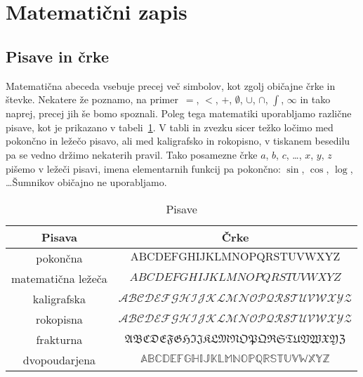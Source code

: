 







\section{Matematični zapis}
\label{sec:matematicni-zapis}

\subsection{Pisave in črke}
\label{sec:pisave-in-crke}


Matematična abeceda vsebuje precej več simbolov, kot zgolj običajne črke in števke. Nekatere že poznamo, na primer~$=$, $<$, $+$, $\emptyset$, $\cup$, $\cap$, $\int$, $\infty$ in tako naprej, precej jih še bomo spoznali. Poleg tega matematiki uporabljamo različne pisave, kot je prikazano v tabeli~\ref{tabela:oblike-crk}. V tabli in zvezku sicer težko ločimo med pokončno in ležečo pisavo, ali med kaligrafsko in rokopisno, v tiskanem besedilu pa se vedno držimo nekaterih pravil. Tako posamezne črke $a$, $b$, $c$, \dots, $x$, $y$, $z$ pišemo v ležeči pisavi, imena elementarnih funkcij pa pokončno: $\sin$, $\cos$, $\log$, \ldots Šumnikov običajno ne uporabljamo.

\begin{table}[ht]
\centering
\begin{tabular}{c|c}
\textbf{Pisava} & \textbf{Črke} \\
\hline
pokončna & $\mathrm{ABCDEFGHIJKLMNOPQRSTUVWXYZ}$ \\
matematična ležeča & $ABCDEFGHIJKLMNOPQRSTUVWXYZ$ \\
kaligrafska & $\mathcal{ABCDEFGHIJKLMNOPQRSTUVWXYZ}$ \\
rokopisna & $\mathscr{ABCDEFGHIJKLMNOPQRSTUVWXYZ}$ \\
frakturna & $\mathfrak{ABCDEFGHIJKLMNOPQRSTUVWXYZ}$ \\
dvopoudarjena & $\mathbb{ABCDEFGHIJKLMNOPQRSTUVWXYZ}$
\end{tabular}
\caption{Pisave}\label{tabela:oblike-crk}
\end{table}

